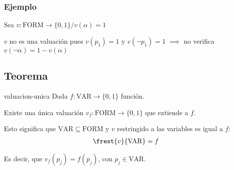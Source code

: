 \subsubsection{Ejemplo}
Sea $v: \mathrm{FORM} \to \{ 0,1 \} / v(\alpha) = 1$

$v$ no es una valuación pues $v(p_1)=1$ y $v(\neg p_1) = 1$
$\implies$ no verifica $v(\neg \alpha) = 1 - v(\alpha)$

\subsection{Teorema}

\begin{teorema}{}{valuacion-unica}
    Dada $f: \mathrm{VAR}\to \{ 0,1 \}$ función.

    \medskip

    Existe una única valuación
    $v_f: \mathrm{FORM} \to \{ 0,1 \}$ que extiende a $f$.
\end{teorema}

Esto significa que $\mathrm{VAR} \subseteq \mathrm{FORM}$ y $v$ restringido
a las variables es igual a $f$:
\begin{gather*}
    \frest{v}{\mathrm{VAR}} = f
\end{gather*}

Es decir, que $v_f(p_j) = f(p_j)$, con $p_j \in \mathrm{VAR}$.


